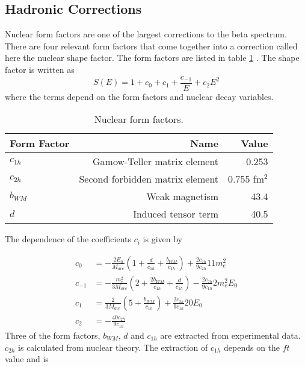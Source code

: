 \documentclass[../MaxHughesThesis.tex]{subfiles}
\begin{document}
\subsection{Hadronic Corrections}

Nuclear form factors are one of the largest corrections to the beta spectrum.
There are four relevant form factors that come together into a correction called here the nuclear shape factor.
The form factors are listed in table \ref{tab:formfact} \cite{Cal77}.
The shape factor is written as 
\begin{equation}
	\label{eq:shapefactor}
	S(E) = 1 + c_{0} + c_{1} + \frac{c_{-1}}{E} + c_{2}E^{2}	
\end{equation}
where the terms depend on the form factors and nuclear decay variables.
\begin{table}[!hbt]
	\centering
	\caption{Nuclear form factors.}
		\begin{tabular}{lrr}
		Form Factor & Name & Value \\ \hline
		$c_{1h}$ & Gamow-Teller matrix element & 0.253  \cite{Min11}\\
		$c_{2h}$ & Second forbidden matrix element & 0.755 fm$^{2}$ \cite{Cal77} \\
		$b_{WM}$ & Weak magnetism & 43.4  \cite{Min11} \\
		$d$ & Induced tensor term & 40.5  \cite{Min11}
		\end{tabular}
	\label{tab:formfact}
\end{table}
The dependence of the coefficients $c_{i}$ is given by\cite{Cal77}

\begin{equation}
	\label{eq:sfcs}
	\begin{split}
	c_{0} & = -\frac{2 E_{0}}{M_{ave}}(1 + \frac{d}{c_{1h}} + \frac{b_{WM}}{c_{1h}})  + \frac{2 c_{2h}}{9 c_{2h}} 11 m_{e}^{2} \\
	c_{-1} & = -\frac{m_{e}^{2}}{3M_{ave}} (2 + \frac{2b_{WM}}{c_{1h}} + \frac{d}{c_{1h}})  - \frac{2 c_{2h}}{9 c_{1h}} 2 m_{e}^{2} E_{0}\\
	c_{1} & =  \frac{2}{3M_{ave}} (5 + \frac{b_{WM}}{c_{1h}}) + \frac{2 c_{2h}}{9 c_{1h}} 20 E_{0} \\
	c_{2} & = -\frac{40 c_{2h}}{9 c_{1h}} 
	\end{split}
\end{equation}
Three of the form factors, $b_{WM}$, $d$ and $c_{1h}$ are extracted from experimental data. 
$c_{2h}$ is calculated from nuclear theory. 
The extraction of $c_{1h}$ depends on the $ft$ value and is \cite{Min11}
\end{document}
